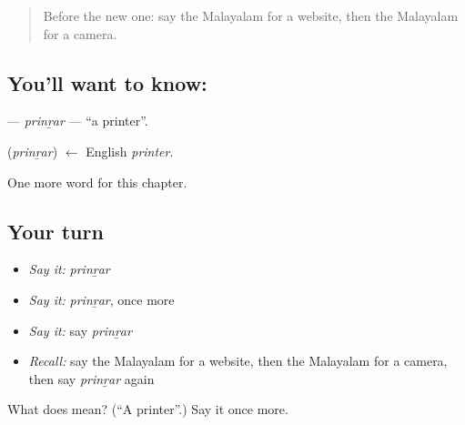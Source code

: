 \begin{quote}
Before the new one: say the Malayalam for a website, then the Malayalam for a camera.
\end{quote}

\subsection*{You'll want to know: }
\textbf{} — \emph{prinṟar} — \textquotedblleft{}a printer\textquotedblright{}.

\begin{cousinweb}
\textbf{} (\emph{prinṟar}) $\leftarrow$ English \emph{printer}.
\end{cousinweb}

\begin{grammarlens}[title={What you've built}]
One more word for this chapter.
\end{grammarlens}

\subsection*{Your turn}
\begin{itemize}
\raggedright
  \item \emph{Say it:} \emph{prinṟar}
  \item \emph{Say it:} \emph{prinṟar}, once more
  \item \emph{Say it:} say \emph{prinṟar}
  \item \emph{Recall:} say the Malayalam for a website, then the Malayalam for a camera, then say \emph{prinṟar} again
\end{itemize}

\begin{tcolorbox}[breakable,colback=teal!4,colframe=teal!35!black,title={Before you move on}]
What does  mean? (\textquotedblleft{}A printer\textquotedblright{}.) Say it once more.
\end{tcolorbox}
